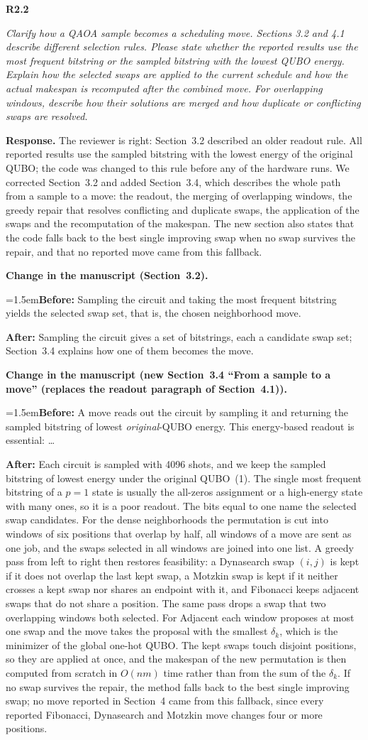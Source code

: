 \documentclass[11pt]{article}
\newenvironment{rc}[1]{\par\medskip\noindent\textbf{#1}\par\nopagebreak\noindent\itshape\ignorespaces}{\par}
\newcommand{\answer}[1]{\par\smallskip\noindent\textbf{Response.} #1\par}
\newcommand{\change}[3]{\par\smallskip\noindent\textbf{Change in the manuscript (#1).}\par
  {\leftskip=1.5em\noindent\textbf{Before:} #2\par\noindent\textbf{After:} #3\par}}
\begin{document}
\begin{rc}{R2.2}
Clarify how a QAOA sample becomes a scheduling move. Sections 3.2 and 4.1 describe different selection rules. Please state whether the reported results use the most frequent bitstring or the sampled bitstring with the lowest QUBO energy. Explain how the selected swaps are applied to the current schedule and how the actual makespan is recomputed after the combined move. For overlapping windows, describe how their solutions are merged and how duplicate or conflicting swaps are resolved.
\end{rc}
\answer{The reviewer is right: Section~3.2 described an older readout rule. All reported results use the sampled bitstring with the lowest energy of the original QUBO; the code was changed to this rule before any of the hardware runs. We corrected Section~3.2 and added Section~3.4, which describes the whole path from a sample to a move: the readout, the merging of overlapping windows, the greedy repair that resolves conflicting and duplicate swaps, the application of the swaps and the recomputation of the makespan. The new section also states that the code falls back to the best single improving swap when no swap survives the repair, and that no reported move came from this fallback.}
\change{Section~3.2}{Sampling the circuit and taking the most frequent bitstring yields the selected swap set, that is, the chosen neighborhood move.}{Sampling the circuit gives a set of bitstrings, each a candidate swap set; Section~3.4 explains how one of them becomes the move.}
\change{new Section~3.4 ``From a sample to a move'' (replaces the readout paragraph of Section~4.1)}{A move reads out the circuit by sampling it and returning the sampled bitstring of lowest \emph{original}-QUBO energy. This energy-based readout is essential: \ldots}{Each circuit is sampled with 4096 shots, and we keep the sampled bitstring of lowest energy under the original QUBO~(1). The single most frequent bitstring of a $p=1$ state is usually the all-zeros assignment or a high-energy state with many ones, so it is a poor readout. The bits equal to one name the selected swap candidates. For the dense neighborhoods the permutation is cut into windows of six positions that overlap by half, all windows of a move are sent as one job, and the swaps selected in all windows are joined into one list. A greedy pass from left to right then restores feasibility: a Dynasearch swap $(i,j)$ is kept if it does not overlap the last kept swap, a Motzkin swap is kept if it neither crosses a kept swap nor shares an endpoint with it, and Fibonacci keeps adjacent swaps that do not share a position. The same pass drops a swap that two overlapping windows both selected. For Adjacent each window proposes at most one swap and the move takes the proposal with the smallest $\delta_k$, which is the minimizer of the global one-hot QUBO. The kept swaps touch disjoint positions, so they are applied at once, and the makespan of the new permutation is then computed from scratch in $O(nm)$ time rather than from the sum of the $\delta_k$. If no swap survives the repair, the method falls back to the best single improving swap; no move reported in Section~4 came from this fallback, since every reported Fibonacci, Dynasearch and Motzkin move changes four or more positions.}
\end{document}
